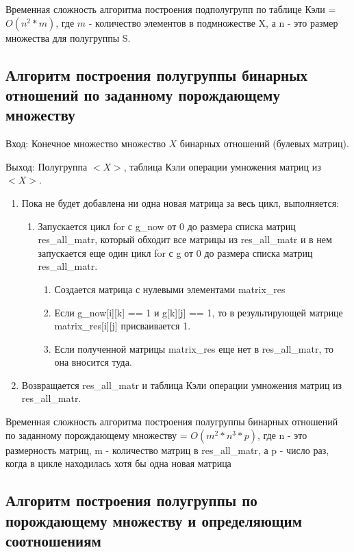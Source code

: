 \documentclass[bachelor, och, labwork]{shiza}
\begin{document}
	Временная сложность алгоритма построения подполугрупп по таблице Кэли = $O(n^2 * m)$, где $m$ - количество элементов в подмножестве X, а n - это размер множества для полугруппы S.
	
	\subsection{Алгоритм построения полугруппы бинарных отношений по заданному порождающему множеству}
	
	$\textit{Вход:}$ Конечное множество множество $X$ бинарных отношений (булевых матриц).
	
	$\textit{Выход:}$  Полугруппа $<X>$, таблица Кэли операции умножения матриц из $<X>$.
	
	\begin{enumerate} 
		\item Пока не будет добавлена ни одна новая матрица за весь цикл, выполняется:
		\begin{enumerate} 
			\item Запускается цикл for с g\_now от 0 до размера списка матриц res\_all\_matr, который обходит все матрицы из res\_all\_matr и в нем запускается еще один цикл for с g от 0 до размера списка матриц res\_all\_matr.
				\begin{enumerate} 
						\item Создается матрица с нулевыми элементами  matrix\_res
						\item Если g\_now[i][k] == 1 и  g[k][j] == 1, то в результирующей матрице matrix\_res[i][j] присваивается 1.
						\item Если полученной матрицы matrix\_res еще нет в res\_all\_matr, то она вносится туда.
				\end{enumerate}
		\end{enumerate}
		\item Возвращается res\_all\_matr и таблица Кэли операции умножения матриц из res\_all\_matr.
	\end{enumerate} 
	
	Временная сложность алгоритма построения полугруппы бинарных отношений по заданному порождающему множеству = $O(m^2 * n^3 * p)$, где n - это размерность матриц, m - количество матриц в res\_all\_matr, а p - число раз, когда в цикле находилась хотя бы одна новая матрица
	
	\subsection{Алгоритм построения полугруппы по порождающему множеству и определяющим соотношениям}
	
\end{document}
